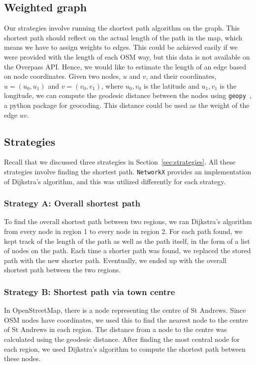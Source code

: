 \documentclass[12pt,a4paper]{report}
\begin{document}
\subsection{Weighted graph}
Our strategies involve running the shortest path algorithm on the graph. This shortest path should reflect on the actual length of the path in the map, which means we have to assign weights to edges. This could be achieved easily if we were provided with the length of each OSM way, but this data is not available on the Overpass API. Hence, we would like to estimate the length of an edge based on node coordinates. Given two nodes, $u$ and $v$, and their coordinates, $u = (u_0, u_1)$ and $v = (v_0, v_1)$, where $u_0, v_0$ is the latitude and $u_1, v_1$ is the longitude, we can compute the geodesic distance between the nodes using \texttt{geopy}~\cite{geopy}, a python package for geocoding. This distance could be used as the weight of the edge $uv$.

\subsection{Strategies}
Recall that we discussed three strategies in Section~\ref{sec:strategies}. All these strategies involve finding the shortest path. \texttt{NetworkX} provides an implementation of Dijkstra's algorithm, and this was utilized differently for each strategy. 

\subsubsection*{Strategy A: Overall shortest path}
To find the overall shortest path between two regions, we ran Dijkstra's algorithm from every node in region 1 to every node in region 2. For each path found, we kept track of the length of the path as well as the path itself, in the form of a list of nodes on the path. Each time a shorter path was found, we replaced the stored path with the new shorter path. Eventually, we ended up with the overall shortest path between the two regions.

\subsubsection*{Strategy B: Shortest path via town centre}
In OpenStreetMap, there is a node representing the centre of St Andrews. Since OSM nodes have coordinates, we used this to find the nearest node to the centre of St Andrews in each region. The distance from a node to the centre was calculated using the geodesic distance. After finding the most central node for each region, we used Dijkstra's algorithm to compute the shortest path between these nodes.
\end{document}
